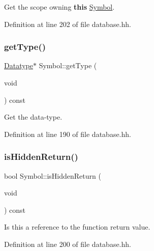 Get the scope owning {\bfseries{this}} \mbox{\hyperlink{class_symbol}{Symbol}}. 



Definition at line 202 of file database.\+hh.

\mbox{\label{class_symbol_adc3b41817547e9b7d3379d43da912e2b}} 
\subsubsection{\texorpdfstring{getType()}{getType()}}
{\footnotesize\ttfamily \mbox{\hyperlink{class_datatype}{Datatype}}$\ast$ Symbol\+::get\+Type (\begin{DoxyParamCaption}\item[{void}]{ }\end{DoxyParamCaption}) const\hspace{0.3cm}{\ttfamily [inline]}}



Get the data-\/type. 



Definition at line 190 of file database.\+hh.

\mbox{\label{class_symbol_a26be01aae9268f6a20d3c9f467c8302f}} 
\subsubsection{\texorpdfstring{isHiddenReturn()}{isHiddenReturn()}}
{\footnotesize\ttfamily bool Symbol\+::is\+Hidden\+Return (\begin{DoxyParamCaption}\item[{void}]{ }\end{DoxyParamCaption}) const\hspace{0.3cm}{\ttfamily [inline]}}



Is this a reference to the function return value. 



Definition at line 200 of file database.\+hh.

\mbox{\label{class_symbol_a0a31410a7ede97f106cb72a5fe0e8232}} 
